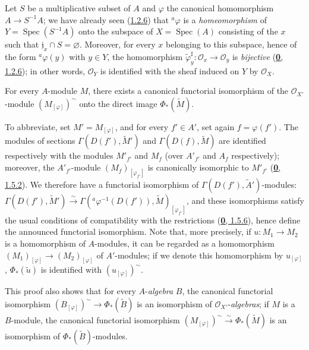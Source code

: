 \begin{example}[1.6.2]
\label{I.1.6.2}
Let $S$ be a multiplicative subset of $A$ and $\varphi$ the canonical
homomorphism $A\to S^{-1}A$; we have already seen
(\hyperref[I.1.2.6]{1.2.6}) that ${}^a\varphi$ is a
\emph{homeomorphism} of $Y=\operatorname{Spec}(S^{-1}A)$ onto the
subspace of $X=\operatorname{Spec}(A)$ consisting of the $x$ such that
$\mathfrak{j}_x\cap S=\varnothing$. Moreover, for every $x$ belonging to
this subspace, hence of the form ${}^a\varphi(y)$ with $y\in Y$,
the homomorphism
$\widetilde{\varphi}_y^{\sharp}:\mathscr{O}_x\to\mathscr{O}_y$ is
\emph{bijective} (\hyperref[0.1.2.6]{\textbf{0}, 1.2.6}); in other words,
$\mathscr{O}_Y$ is identified with the sheaf induced on $Y$ by
$\mathscr{O}_X$.
\end{example}

\begin{proposition}[1.6.3]
\label{I.1.6.3}
For every $A$-module $M$, there exists a canonical functorial isomorphism of
the $\mathscr{O}_{X'}$-module $(M_{[\varphi]})^{\sim}$ onto the direct image
$\Phi_*(\widetilde{M})$.
\end{proposition}

To abbreviate, set $M'=M_{[\varphi]}$, and for every $f'\in A'$, set
again $f=\varphi(f')$. The modules of sections
$\Gamma(D(f'),\widetilde{M}')$ and $\Gamma(D(f),\widetilde{M})$
are identified respectively with the modules $M'_{f'}$ and $M_f$ (over
$A'_{f'}$ and $A_f$ respectively); moreover, the $A'_{f'}$-module
$(M_f)_{[\varphi_{f'}]}$ is canonically isomorphic to $M'_{f'}$
(\hyperref[0.1.5.2]{\textbf{0}, 1.5.2}). We therefore have a functorial
isomorphism of $\Gamma(D(f'),\widetilde{A}')$-modules:
$\Gamma(D(f'),\widetilde{M}')\xrightarrow{\sim}
\Gamma({}^a\varphi^{-1}(D(f')),\widetilde{M})_{[\varphi_{f'}]}$, and these
isomorphisms satisfy the usual conditions of compatibility with the
restrictions (\hyperref[0.1.5.6]{\textbf{0}, 1.5.6}), hence define the announced
functorial isomorphism. Note that, more precisely, if
$u:M_1\to M_2$ is a homomorphism of $A$-modules, it can be regarded as a
homomorphism $(M_1)_{[\varphi]}\to(M_2)_{[\varphi]}$ of
$A'$-modules; if we denote this homomorphism by $u_{[\varphi]}$,
$\Phi_*(\widetilde{u})$ is identified with $(u_{[\varphi]})^{\sim}$.

This proof also shows that for every $A$-\emph{algebra} $B$, the
canonical functorial isomorphism
$(B_{[\varphi]})^{\sim}\to\Phi_*(\widetilde{B})$ is an
isomorphism of $\mathscr{O}_{X'}$-\emph{algebras}; if $M$ is a $B$-module,
the canonical functorial isomorphism
$(M_{[\varphi]})^{\sim}\xrightarrow{\sim}\Phi_*(\widetilde{M})$ is an
isomorphism of $\Phi_*(\widetilde{B})$-modules.

